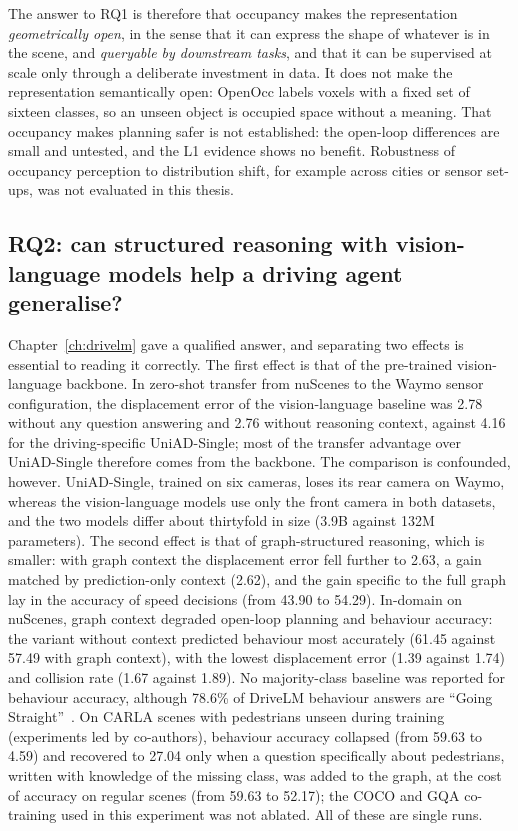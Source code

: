 The answer to RQ1 is therefore that occupancy makes the representation \emph{geometrically open}, in the sense that it can express the shape of whatever is in the scene, and \emph{queryable by downstream tasks}, and that it can be supervised at scale only through a deliberate investment in data. It does not make the representation semantically open: OpenOcc labels voxels with a fixed set of sixteen classes, so an unseen object is occupied space without a meaning. That occupancy makes planning safer is not established: the open-loop differences are small and untested, and the L1 evidence shows no benefit. Robustness of occupancy perception to distribution shift, for example across cities or sensor set-ups, was not evaluated in this thesis.

\subsection{RQ2: can structured reasoning with vision-language models help a driving agent generalise?}

Chapter~\ref{ch:drivelm} gave a qualified answer, and separating two effects is essential to reading it correctly. The first effect is that of the pre-trained vision-language backbone. In zero-shot transfer from nuScenes to the Waymo sensor configuration, the displacement error of the vision-language baseline was 2.78 without any question answering and 2.76 without reasoning context, against 4.16 for the driving-specific UniAD-Single; most of the transfer advantage over UniAD-Single therefore comes from the backbone. The comparison is confounded, however. UniAD-Single, trained on six cameras, loses its rear camera on Waymo, whereas the vision-language models use only the front camera in both datasets, and the two models differ about thirtyfold in size (3.9B against 132M parameters). The second effect is that of graph-structured reasoning, which is smaller: with graph context the displacement error fell further to 2.63, a gain matched by prediction-only context (2.62), and the gain specific to the full graph lay in the accuracy of speed decisions (from 43.90 to 54.29). In-domain on nuScenes, graph context degraded open-loop planning and behaviour accuracy: the variant without context predicted behaviour most accurately (61.45 against 57.49 with graph context), with the lowest displacement error (1.39 against 1.74) and collision rate (1.67 against 1.89). No majority-class baseline was reported for behaviour accuracy, although 78.6\% of DriveLM behaviour answers are ``Going Straight''~\cite{xie2025vlms}. On CARLA scenes with pedestrians unseen during training (experiments led by co-authors), behaviour accuracy collapsed (from 59.63 to 4.59) and recovered to 27.04 only when a question specifically about pedestrians, written with knowledge of the missing class, was added to the graph, at the cost of accuracy on regular scenes (from 59.63 to 52.17); the COCO and GQA co-training used in this experiment was not ablated. All of these are single runs.


